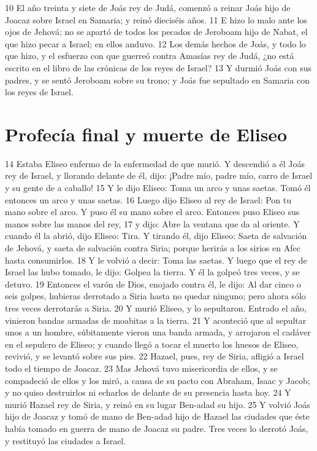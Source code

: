 10 El año treinta y siete de Joás rey de Judá, comenzó a reinar Joás hijo de Joacaz sobre Israel en Samaria; y reinó dieciséis años.
11 E hizo lo malo ante los ojos de Jehová; no se apartó de todos los pecados de Jeroboam hijo de Nabat, el que hizo pecar a Israel; en ellos anduvo.
12 Los demás hechos de Joás, y todo lo que hizo, y el esfuerzo con que guerreó contra Amasías rey de Judá, ¿no está escrito en el libro de las crónicas de los reyes de Israel?
13 Y durmió Joás con sus padres, y se sentó Jeroboam sobre su trono; y Joás fue sepultado en Samaria con los reyes de Israel.
\section*{Profecía final y muerte de Eliseo}

14 Estaba Eliseo enfermo de la enfermedad de que murió. Y descendió a él Joás rey de Israel, y llorando delante de él, dijo: ¡Padre mío, padre mío, carro de Israel y su gente de a caballo! 
15 Y le dijo Eliseo: Toma un arco y unas saetas. Tomó él entonces un arco y unas saetas.
16 Luego dijo Eliseo al rey de Israel: Pon tu mano sobre el arco. Y puso él su mano sobre el arco. Entonces puso Eliseo sus manos sobre las manos del rey,
17 y dijo: Abre la ventana que da al oriente. Y cuando él la abrió, dijo Eliseo: Tira. Y tirando él, dijo Eliseo: Saeta de salvación de Jehová, y saeta de salvación contra Siria; porque herirás a los sirios en Afec hasta consumirlos.
18 Y le volvió a decir: Toma las saetas. Y luego que el rey de Israel las hubo tomado, le dijo: Golpea la tierra. Y él la golpeó tres veces, y se detuvo.
19 Entonces el varón de Dios, enojado contra él, le dijo: Al dar cinco o seis golpes, hubieras derrotado a Siria hasta no quedar ninguno; pero ahora sólo tres veces derrotarás a Siria.
20 Y murió Eliseo, y lo sepultaron. Entrado el año, vinieron bandas armadas de moabitas a la tierra.
21 Y aconteció que al sepultar unos a un hombre, súbitamente vieron una banda armada, y arrojaron el cadáver en el sepulcro de Eliseo; y cuando llegó a tocar el muerto los huesos de Eliseo, revivió, y se levantó sobre sus pies.
22 Hazael, pues, rey de Siria, afligió a Israel todo el tiempo de Joacaz.
23 Mas Jehová tuvo misericordia de ellos, y se compadeció de ellos y los miró, a causa de su pacto con Abraham, Isaac y Jacob; y no quiso destruirlos ni echarlos de delante de su presencia hasta hoy.
24 Y murió Hazael rey de Siria, y reinó en su lugar Ben-adad su hijo.
25 Y volvió Joás hijo de Joacaz y tomó de mano de Ben-adad hijo de Hazael las ciudades que éste había tomado en guerra de mano de Joacaz su padre. Tres veces lo derrotó Joás, y restituyó las ciudades a Israel.

